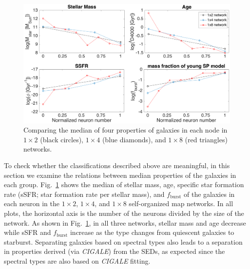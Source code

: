        \begin{figure}
            \centering
            \includegraphics[width=\textwidth]{images0.01/1d/props5.png}
            \caption[The median of four properties of galaxies in three networks]{Comparing the median of four properties of galaxies in each node in $1\times2$ (black circles), $1\times4$ (blue diamonds), and $1\times8$ (red triangles) networks.}
            \label{fig: props}
        \end{figure} 
        
       To check whether the classifications described above are meaningful, in this section we examine the relations between median properties of the galaxies in each group. 
          Fig.~\ref{fig: props} shows the median of stellar mass, age, specific star formation rate (sSFR; star formation rate per stellar mass), and $f_\mathrm{burst}$ of the galaxies in each neuron in the $1\times2$, $1\times4$, and $1\times8$ self-organized map networks.
        In all plots, the horizontal axis is the number of the neurons divided by the size of the network.
        As shown in Fig.~\ref{fig: props}, in all three networks, stellar mass and age decrease while sSFR and $f_\mathrm{burst}$ increase as the type changes from quiescent galaxies to starburst.
       Separating galaxies based on spectral types also leads to a separation in properties derived (via {\em CIGALE}) from the SEDs, as expected since the spectral types are also based on {\em CIGALE} fitting. 
    

